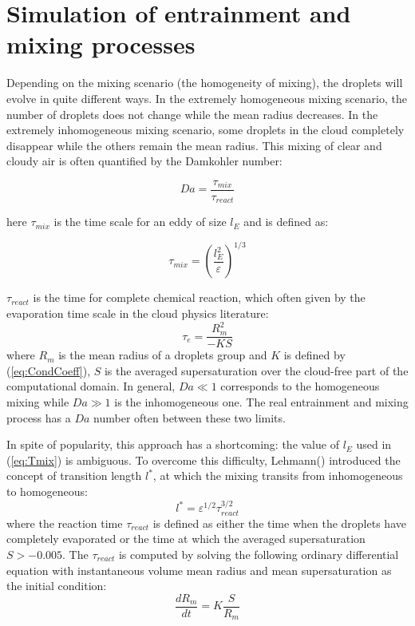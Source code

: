 \documentclass[12pt]{article}
\begin{document}
\section{Simulation of entrainment and mixing processes}

Depending on the mixing scenario (the homogeneity of mixing), the
droplets will evolve in quite different ways. In the extremely homogeneous mixing scenario, the number of droplets does not change while the mean radius decreases. In the extremely inhomogeneous mixing scenario, some droplets in the cloud completely disappear while the others remain the mean radius. This mixing of clear and cloudy air is often quantified by the Damkohler number:

\begin{equation}
Da=\frac{\tau_{mix}}{\tau_{react}}\label{eq:DaNumber}
\end{equation}


here $\tau_{mix}$ is the time scale for an eddy of size $l_E$ and is defined as:

\begin{equation}
\tau_{mix}=(\frac{l_E^{2}}{\varepsilon})^{1/3}\label{eq:Tmix}
\end{equation}

$\tau_{react}$ is the time for complete chemical reaction, which often given by the evaporation time scale in the cloud physics literature:
\begin{equation}
\tau_{e}=\frac{R_{m}^{2}}{-KS}\label{eq:Tevap}
\end{equation}
where $R_{m}$ is the mean radius of a droplets group and $K$ is defined
by (\ref{eq:CondCoeff}), $S$ is the averaged supersaturation over
the cloud-free part of the computational domain. In general, $Da\ll1$ corresponds to the homogeneous mixing while $Da\gg1$ is the inhomogeneous one. The real entrainment and mixing process has a $Da$ number often between
these two limits.

In spite of popularity, this approach has a shortcoming:
the value of $l_E$ used in (\ref{eq:Tmix}) is ambiguous. To overcome this difficulty, Lehmann(\cite{Lehmann09}) introduced the concept of transition length $l^{*}$, at which the mixing transits from inhomogeneous to homogeneous:
\begin{equation}
l^{*}=\varepsilon^{1/2}\tau_{react}^{3/2}\label{eq:TransL}
\end{equation}
where the reaction time $\tau_{react}$ is defined as either the time when the droplets have completely evaporated or the time at which the averaged supersaturation $S>-0.005$. The $\tau_{react}$ is computed by solving the following ordinary differential equation with instantaneous volume mean radius and mean supersaturation as the initial condition:
\begin{equation}
\frac{dR_{m}}{dt}=K\frac{S}{R_{m}}\label{eq:DiffR}
\end{equation}
\end{document}
